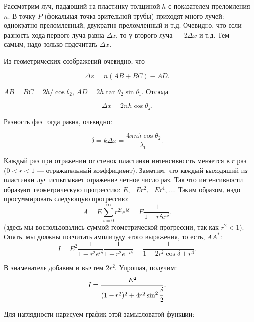 \documentclass[12pt,a4paper]{article}
\numberwithin{equation}{section}
\numberwithin{equation}{section}
\begin{document}
Рассмотрим луч, падающий на пластинку толщиной $h$ с показателем
преломления $n$. В точку $P$ (фокальная точка зрительной трубы)
приходят много лучей: однократно преломленный, двукратно преломленный
и т.д. Очевидно, что если разность хода первого луча равна $\Delta x$,
то у второго луча --- $2 \Delta x$ и т.д. Тем самым, надо только
подсчитать $\Delta x$.

Из геометрических соображений очевидно, что 

\begin{equation}
\Delta x = n (AB + BC) - AD.
\end{equation}

$AB = BC = 2h / \cos \theta_2$, $AD = 2 h \tan \theta_2 \sin \theta_1$. Отсюда 

\begin{equation}
\Delta x = 2 n h \cos \theta_2.
\end{equation}

Разность фаз тогда равна, очевидно:

\begin{equation}
\delta = k \Delta x = \frac{4 \pi n h \cos \theta_2}{\lambda_0}.
\end{equation}

Каждый раз при отражении от стенок пластинки интенсивность меняется в
$r$ раз ($0<r<1$ --- отражательный коэффициент). Заметим, что каждый
выходящий из пластинки луч испытывает отражение четное число раз. Так
что интенсивности образуют геометрическую прогрессию: $E, \mbox{ }
Er^2, \mbox{ } Er^4, \ldots$. Таким образом, надо просуммировать
следующую прогрессию:
\begin{equation}
A = E \sum_{i=0}^{\infty} r^{2i} e^{i \delta} = E \frac{1}{1 - r^2 e^{i \delta}}.
\end{equation}
(здесь мы воспользовались суммой геометрической прогрессии, так как
$r^2 <1$). Опять, мы должны посчитать амплитуду этого выражения, то
есть, $AA^{*}$:
\begin{equation}
I =E^2 \frac{1}{1 - r^2 e^{i \delta}} \frac{1}{1 - r^2 e^{-i \delta}} = \frac{1}{1 - 2r^2 \cos \delta + r^4}.
\end{equation}

В знаменателе добавим и вычтем $2r^2$. Упрощая, получим:
\begin{equation}
I = \frac{E^2}{(1-r^2)^2 + 4 r^2 \sin^2 \cfrac{\delta}{2}}.
\end{equation}

Для наглядности нарисуем график этой замысловатой функции:
\end{document}
